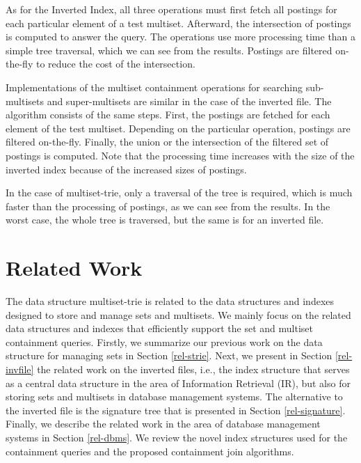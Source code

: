 \documentclass[algorithms,article,accept,pdftex,moreauthors]{Definitions/mdpi}
\begin{document}
As for the Inverted Index, all three operations must first fetch all
postings for each particular element of a test multiset. Afterward,
the intersection of postings is computed to answer the query. The
operations use more processing time than a simple tree traversal,
which we can see from the results. Postings are filtered on-the-fly to
reduce the cost of the intersection.

Implementations of the multiset containment operations
for searching sub-multisets and super-multisets are similar in
the case of the inverted file. The algorithm consists of the same
steps. First, the postings are fetched for each element of the test
multiset. Depending on the particular operation, postings are filtered
on-the-fly. Finally, the union or the intersection of the filtered set
of postings is computed. Note that the processing time increases with
the size of the inverted index because of the increased sizes of
postings.

In the case of multiset-trie, only a traversal of the tree is
required, which is much faster than the processing of postings, as we
can see from the results. In the worst case, the whole tree is
traversed, but the same is for an inverted file.

%
\section{Related Work} \label{c:relwork}

The data structure multiset-trie is related to the data structures and indexes designed to store and manage sets and multisets. We mainly focus on the related data structures and indexes that efficiently support the set and multiset containment queries. Firstly, we summarize our previous work on the data structure for managing sets in Section \ref{rel-strie}. Next, we present in Section \ref{rel-invfile} the related work on the inverted files, i.e., the index structure that serves as a central data structure in the area of Information Retrieval (IR), but also for storing sets and multisets in database management systems. The alternative to the inverted file is the signature tree that is presented in Section \ref{rel-signature}. Finally, we describe the related work in the area of database management systems in Section \ref{rel-dbms}. We review the novel index structures used for the containment queries and the proposed containment join algorithms. 

\end{document}

